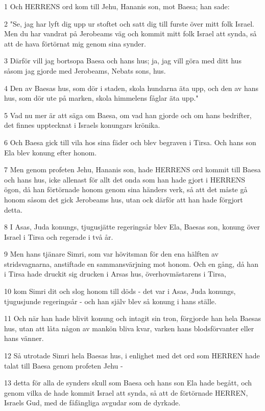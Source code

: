\par 1 Och HERRENS ord kom till Jehu, Hananis son, mot Baesa; han sade:
\par 2 "Se, jag har lyft dig upp ur stoftet och satt dig till furste över mitt folk Israel. Men du har vandrat på Jerobeams väg och kommit mitt folk Israel att synda, så att de hava förtörnat mig genom sina synder.
\par 3 Därför vill jag bortsopa Baesa och hans hus; ja, jag vill göra med ditt hus såsom jag gjorde med Jerobeams, Nebats sons, hus.
\par 4 Den av Baesas hus, som dör i staden, skola hundarna äta upp, och den av hans hus, som dör ute på marken, skola himmelens fåglar äta upp."
\par 5 Vad nu mer är att säga om Baesa, om vad han gjorde och om hans bedrifter, det finnes upptecknat i Israels konungars krönika.
\par 6 Och Baesa gick till vila hos sina fäder och blev begraven i Tirsa. Och hans son Ela blev konung efter honom.
\par 7 Men genom profeten Jehu, Hananis son, hade HERRENS ord kommit till Baesa och hans hus, icke allenast för allt det onda som han hade gjort i HERRENS ögon, då han förtörnade honom genom sina händers verk, så att det måste gå honom såsom det gick Jerobeams hus, utan ock därför att han hade förgjort detta.
\par 8 I Asas, Juda konungs, tjugusjätte regeringsår blev Ela, Baesas son, konung över Israel i Tirsa och regerade i två år.
\par 9 Men hans tjänare Simri, som var hövitsman för den ena hälften av stridsvagnarna, anstiftade en sammansvärjning mot honom. Och en gång, då han i Tirsa hade druckit sig drucken i Arsas hus, överhovmästarens i Tirsa,
\par 10 kom Simri dit och slog honom till döds - det var i Asas, Juda konungs, tjugusjunde regeringsår - och han själv blev så konung i hans ställe.
\par 11 Och när han hade blivit konung och intagit sin tron, förgjorde han hela Baesas hus, utan att låta någon av mankön bliva kvar, varken hans blodsförvanter eller hans vänner.
\par 12 Så utrotade Simri hela Baesas hus, i enlighet med det ord som HERREN hade talat till Baesa genom profeten Jehu -
\par 13 detta för alla de synders skull som Baesa och hans son Ela hade begått, och genom vilka de hade kommit Israel att synda, så att de förtörnade HERREN, Israels Gud, med de fåfängliga avgudar som de dyrkade.

